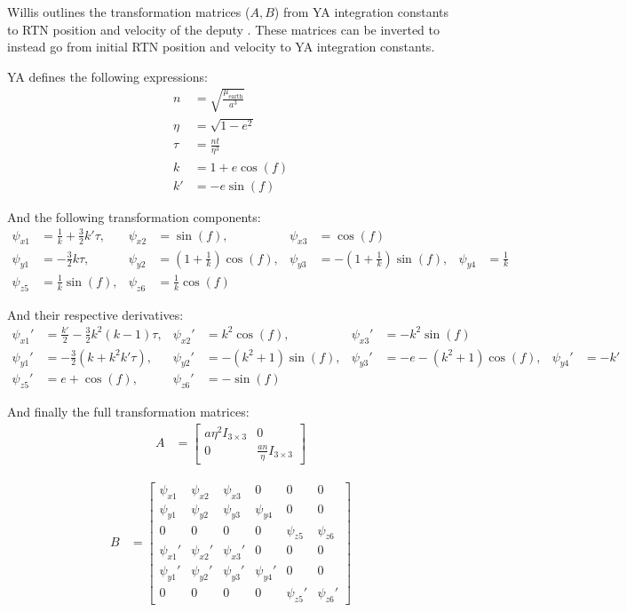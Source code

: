 Willis outlines the transformation matrices ($A,B$) from YA integration constants to RTN position and velocity of the deputy \cite{willis2023analytical}. These matrices can be inverted to instead go from initial RTN position and velocity to YA integration constants. 

YA defines the following expressions:
\begin{align}
n &= \sqrt{\frac{\mu_{\text{earth}}}{a^3}} \\
\eta &= \sqrt{1 - e^2} \\
\tau &= \frac{nt}{\eta^3}\\
k &= 1 + e \cos(f) \\
k' &= -e \sin(f)
\end{align}

And the following transformation components:
\begin{align}
\psi_{x1} &= \frac{1}{k} + \frac{3}{2}k' \tau, &
\psi_{x2} &= \sin(f), &
\psi_{x3} &= \cos(f) \\
\psi_{y1} &= -\frac{3}{2}k\tau, &
\psi_{y2} &= \left(1 + \frac{1}{k}\right)\cos(f), &
\psi_{y3} &= -\left(1 + \frac{1}{k}\right)\sin(f), &
\psi_{y4} &= \frac{1}{k} \\
\psi_{z5} &= \frac{1}{k}\sin(f), &
\psi_{z6} &= \frac{1}{k}\cos(f)
\end{align}

And their respective derivatives:
\begin{align}
\psi_{x1}' &= \frac{k'}{2} - \frac{3}{2}k^2(k - 1)\tau, &
\psi_{x2}' &= k^2 \cos(f), &
\psi_{x3}' &= -k^2 \sin(f) \\
\psi_{y1}' &= -\frac{3}{2}\left(k + k^2k'\tau\right), &
\psi_{y2}' &= -(k^2 + 1)\sin(f), &
\psi_{y3}' &= -e - (k^2 + 1)\cos(f), &
\psi_{y4}' &= -k' \\
\psi_{z5}' &= e + \cos(f), &
\psi_{z6}' &= -\sin(f)
\end{align}

And finally the full transformation matrices:
\begin{align}
A &= 
\begin{bmatrix}
a\eta^2 I_{3 \times 3} & 0 \\
0 & \frac{a n}{\eta} I_{3 \times 3}
\end{bmatrix}
\end{align}

\begin{align}
B &=
\begin{bmatrix}
\psi_{x1} & \psi_{x2} & \psi_{x3} & 0 & 0 & 0 \\
\psi_{y1} & \psi_{y2} & \psi_{y3} & \psi_{y4} & 0 & 0 \\
0 & 0 & 0 & 0 & \psi_{z5} & \psi_{z6} \\
\psi_{x1}' & \psi_{x2}' & \psi_{x3}' & 0 & 0 & 0 \\
\psi_{y1}' & \psi_{y2}' & \psi_{y3}' & \psi_{y4}' & 0 & 0 \\
0 & 0 & 0 & 0 & \psi_{z5}' & \psi_{z6}'
\end{bmatrix}
\end{align}

